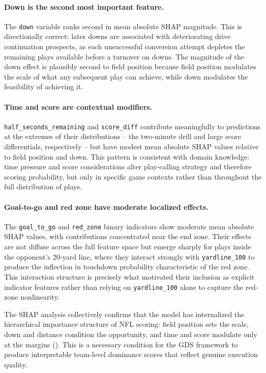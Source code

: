 \paragraph{Down is the second most important feature.}
The \texttt{down} variable ranks second in mean absolute SHAP magnitude.
This is directionally correct: later downs are associated with deteriorating
drive continuation prospects, as each unsuccessful conversion attempt
depletes the remaining plays available before a turnover on downs. The
magnitude of the down effect is plausibly second to field position because
field position modulates the scale of what any subsequent play can achieve,
while down modulates the feasibility of achieving it.

\paragraph{Time and score are contextual modifiers.}
\texttt{half\_seconds\_remaining} and \texttt{score\_diff} contribute
meaningfully to predictions at the extremes of their distributions -- the
two-minute drill and large score differentials, respectively -- but have
modest mean absolute SHAP values relative to field position and down. This
pattern is consistent with domain knowledge: time pressure and score
considerations alter play-calling strategy and therefore scoring probability,
but only in specific game contexts rather than throughout the full
distribution of plays.

\paragraph{Goal-to-go and red zone have moderate localized effects.}
The \texttt{goal\_to\_go} and \texttt{red\_zone} binary indicators show
moderate mean absolute SHAP values, with contributions concentrated near
the end zone. Their effects are not diffuse across the full feature space
but emerge sharply for plays inside the opponent's 20-yard line, where they
interact strongly with \texttt{yardline\_100} to produce the inflection in
touchdown probability characteristic of the red zone. This interaction
structure is precisely what motivated their inclusion as explicit indicator
features rather than relying on \texttt{yardline\_100} alone to capture the
red-zone nonlinearity.

The SHAP analysis collectively confirms that the \xscore{} model has
internalized the hierarchical importance structure of NFL scoring: field
position sets the scale, down and distance condition the opportunity, and
time and score modulate only at the margins (). This is a
necessary condition for the GDS framework to produce interpretable team-level
dominance scores that reflect genuine execution quality.

